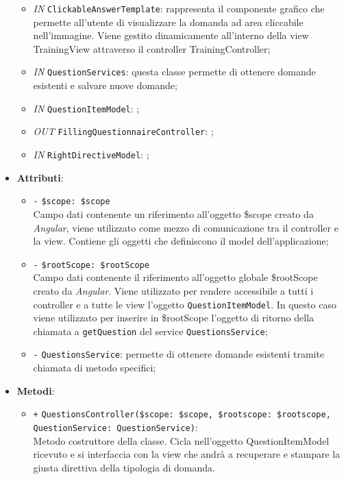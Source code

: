\begin{itemize}
\begin{itemize}
		\item \textit{IN} \texttt{ClickableAnswerTemplate}: rappresenta il componente grafico che permette all'utente di visualizzare la domanda ad area cliccabile nell'immagine. Viene gestito dinamicamente all'interno della view TrainingView attraverso il controller TrainingController;  
		\item \textit{IN} \texttt{QuestionServices}: questa classe permette di ottenere domande esistenti e salvare nuove domande;
		\item \textit{IN} \texttt{QuestionItemModel}: ;
		\item \textit{OUT} \texttt{FillingQuestionnaireController}: ;
		\item \textit{IN} \texttt{RightDirectiveModel}: ;		
	\end{itemize}
	\item \textbf{Attributi}:
	\begin{itemize}
		\item \texttt{-} \texttt{\$scope: \$scope} \\
		Campo dati contenente un riferimento all’oggetto \$scope creato da \textit{Angular}, viene utilizzato come mezzo di comunicazione tra il controller e la view. Contiene gli oggetti che definiscono il model dell’applicazione;
		\item \texttt{-} \texttt{\$rootScope: \$rootScope} \\
		Campo dati contenente il riferimento all'oggetto globale \$rootScope creato da \textit{Angular}. Viene utilizzato per rendere accessibile a tutti i controller e a tutte le view l'oggetto \texttt{QuestionItemModel}. In questo caso viene utilizzato per inserire in \$rootScope l'oggetto di ritorno della chiamata a \texttt{getQuestion} del service \texttt{QuestionsService};
		\item \texttt{-} \texttt{QuestionsService}: permette di ottenere domande esistenti tramite chiamata di metodo specifici;
	\end{itemize}
	\item \textbf{Metodi}:
	\begin{itemize}
		\item \texttt{+} \texttt{QuestionsController(\$scope: \$scope, \$rootscope: \$rootscope, QuestionService: QuestionService)}: \\ Metodo costruttore della classe. Cicla nell'oggetto QuestionItemModel ricevuto e si interfaccia con la view che andrà a recuperare e stampare la giusta direttiva della tipologia di domanda. \\

\end{itemize}
\end{itemize}
